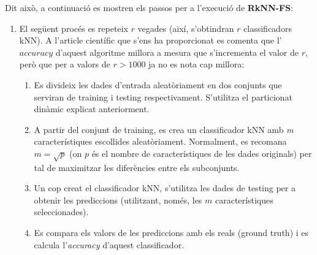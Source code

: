 \documentclass{article} %
\begin{document}
{	Dit això, a continuació es mostren els passos per a l'execució de \textbf{RkNN-FS}:

	\begin{enumerate}
		\item{
			El següent procés es repeteix $r$ vegades (així, s'obtindran $r$ classificadors kNN). A l'article científic que s'ens ha proporcionat es comenta que l'$accuracy$ d'aquest algoritme millora a mesura que s'incrementa el valor de $r$, però que per a valors de $r > 1000$ ja no es nota cap millora:

			\begin{enumerate}
				\item Es divideix les dades d'entrada aleatòriament en dos conjunts que serviran de training i testing respectivament. S'utilitza el particionat dinàmic explicat anteriorment.
				\item A partir del conjunt de training, es crea un classificador kNN amb \textit{m} característiques escollides aleatòriament. Normalment, es recomana $m = \sqrt{p}$ (on $p$ és el nombre de característiques de les dades originals) per tal de maximitzar les diferències entre els subconjunts.
				\item Un cop creat el classificador kNN, s'utilitza les dades de testing per a obtenir les prediccions (utilitzant, només, les $m$ característiques seleccionades).
				\item Es compara els valors de les prediccions amb els reals (ground truth) i es calcula l'\textit{accuracy} d'aquest classificador.
			\end{enumerate}
		}
		

\end{enumerate}}
\end{document}
